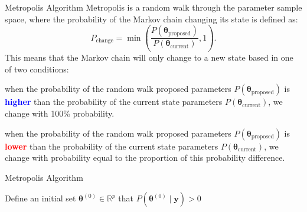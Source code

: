 \begin{frame}{Metropolis Algorithm}
	Metropolis is a random walk through the parameter sample space,
	where the probability of the Markov chain changing its state is defined as:
	$$
		P_{\text{change}} = \min\left({\frac{P (\boldsymbol{\theta}_{\text{proposed}})}{P (\boldsymbol{\theta}_{\text{current}})}},1\right).
	$$
	This means that the Markov chain will only change to a new state based in one of two conditions:
	\begin{vfilleditems}
		\small
		\item when the probability of the random walk proposed parameters
		$P(\boldsymbol{\theta}_{\text{proposed}})$ is \textbf{\textcolor{blue}{higher}}
		than the probability of the current state parameters
		$P(\boldsymbol{\theta}_{\text{current}})$,
		we change with 100\% probability.
		\item when the probability of the random walk proposed parameters
		$P(\boldsymbol{\theta}_{\text{proposed}})$ is \textbf{\textcolor{red}{lower}}
		than the probability of the current state parameters
		$P(\boldsymbol{\theta}_{\text{current}})$,
		we change with probability equal to the proportion of this probability difference.
	\end{vfilleditems}
\end{frame}

\begin{frame}{Metropolis Algorithm}
    \SetAlCapFnt{\normalsize}
    \SetAlCapNameFnt{\normalsize}
    \begin{algorithm}[H]
    \DontPrintSemicolon
    \SetAlgoNoEnd
    \SetAlgoLined
    Define an initial set $\boldsymbol{\theta}^{(0)} \in \mathbb{R}^p$ that $P\left(\boldsymbol{\theta}^{(0)} \mid \mathbf{y} \right) > 0$\;
     \caption{Metropolis}
    \end{algorithm}
\end{frame}

